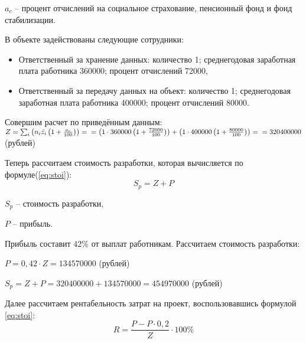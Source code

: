 $a_{c}$ -- процент отчислений на социальное страхование, пенсионный фонд и фонд стабилизации.

В объекте задействованы следующие сотрудники:
\begin{itemize}
    \item Ответственный за хранение данных: количество 1; среднегодовая заработная плата работника 360000; процент отчислений 72000,
    \item Ответственный за передачу данных на объект: количество 1; среднегодовая заработная плата работника 400000; процент отчислений 80000.
\end{itemize}
Совершим расчет по приведённым данным:\\ 
$Z = \sum_{i}^{}{\left(n_{i}\tilde{z_{i}}\left(1+\frac{a_{c}}{100} \right) \right)} = \\ = \left( 1\cdot 360000 \left(1+\frac{72000}{100} \right)\right) + \left( 1\cdot 400000 \left(1+\frac{80000}{100} \right)\right) = \\ = 320400000$ (рублей) 

Теперь рассчитаем  стоимость разработки, которая вычисляется по формуле(\ref{eq:stoi}):
\begin{equation}\label{eq:stoi}
S_{p} = Z + P
\end{equation}

$S_{p}$ -- стоимость разработки,

$P$ -- прибыль.

Прибыль составит 42\% от выплат работникам. Рассчитаем стоимость разработки:
\begin{flushleft}
\begin{math}
P = 0,42 \cdot Z = 134570000\end{math} (рублей)\end{flushleft}
\begin{flushleft}
\begin{math}
S_{p} = Z + P = 320400000 + 134570000 = 454970000
\end{math} (рублей)\end{flushleft}

Далее рассчитаем рентабельность затрат на проект, воспользовавшись формулой \ref{eq:stoi}:
\begin{equation}\label{eq:stoi}
R=\frac{P-P \cdot 0,2}{Z} \cdot 100\%
\end{equation}

